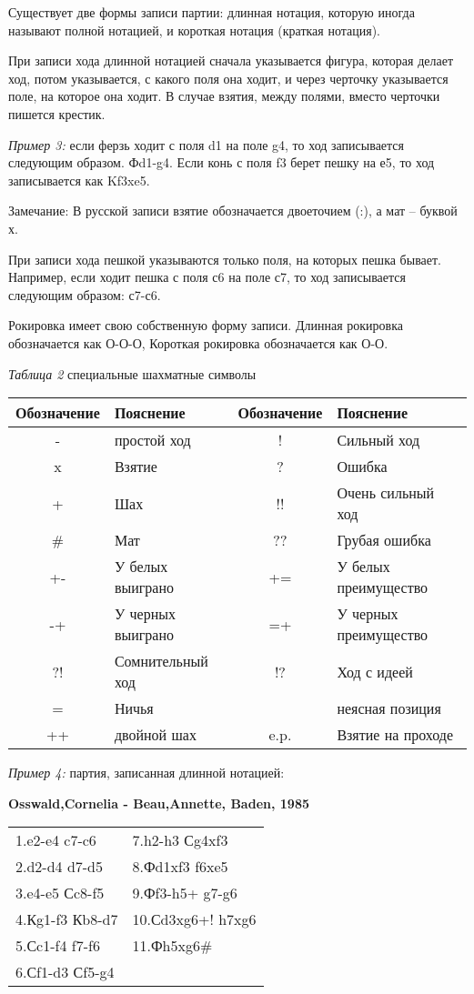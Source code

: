 Существует две формы записи партии: длинная нотация, которую иногда называют полной нотацией, и короткая нотация (краткая нотация).

При записи хода длинной нотацией сначала указывается фигура, которая делает ход, потом указывается, с какого поля она ходит, и через черточку указывается поле, на которое она ходит. В случае взятия, между полями, вместо черточки пишется крестик.

\emph{Пример 3:} если ферзь ходит с поля d1 на поле g4, то ход записывается следующим образом. Фd1-g4. Если конь с поля f3 берет пешку на е5, то ход записывается как Kf3xe5.

Замечание: В русской записи взятие обозначается двоеточием (:), а мат – буквой х.

При записи хода пешкой указываются только поля, на которых пешка бывает. Например, если ходит пешка с поля с6 на поле с7, то ход записывается следующим образом: с7-с6.

Рокировка имеет свою собственную форму записи. Длинная рокировка обозначается как О-О-О, Короткая рокировка обозначается как О-О. 

\begin{center}
\emph{Таблица 2} специальные шахматные символы
\begin{tabular}{ | c | l | c | l | }  
\hline
Обозначение & Пояснение & Обозначение & Пояснение \\ \hline
- & простой ход & ! & Сильный ход \\ \hline
x & Взятие & ? & Ошибка \\ \hline
+ & Шах & !! & Очень сильный ход \\ \hline
\# & Мат & ?? & Грубая ошибка \\ \hline
+- & У белых выиграно & += & У белых преимущество \\ \hline
-+ & У черных выиграно & =+ &У черных преимущество \\ \hline
?! & Сомнительный ход & !? & Ход с идеей \\ \hline
= & Ничья & ~ & неясная позиция \\ \hline
++ & двойной шах & e.p. & Взятие на проходе \\ \hline
\end{tabular}
\end{center}

\emph{Пример 4:} партия, записанная длинной нотацией:
\begin{center} 
\textbf{Osswald,Cornelia - Beau,Annette, Baden, 1985}
\begin{tabular}{ l l }
1.e2-e4 c7-c6 & 7.h2-h3 Сg4xf3 \\
2.d2-d4 d7-d5 & 8.Фd1xf3 f6xe5 \\
3.e4-e5 Сc8-f5 & 9.Фf3-h5+ g7-g6 \\
4.Кg1-f3 Кb8-d7 & 10.Сd3xg6+! h7xg6 \\
5.Сc1-f4 f7-f6 & 11.Фh5xg6\# \\
6.Сf1-d3 Сf5-g4 & \\
\end{tabular}
\end{center}
 
